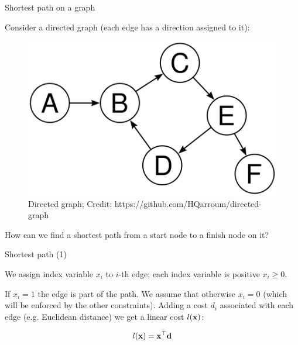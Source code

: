 \documentclass{beamer}
\begin{document}
\begin{frame}{Shortest path on a graph}
\begin{flushleft}

Consider a directed graph (each edge has a direction assigned to it):

\begin{figure}
	\centering
	\includegraphics[width=0.5\linewidth]{DirectedGraph}
	\caption[]{Directed graph; \scriptsize{Credit: https://github.com/HQarroum/directed-graph}}
	\label{fig:directedgraph}
\end{figure}

How can we find a shortest path from a start node to a finish node on it?

\end{flushleft}
\end{frame}



\begin{frame}{Shortest path (1)}
\begin{flushleft}

We assign index variable $x_i$ to $i$-th edge; each index variable is positive $x_i \geq 0$. 

\bigskip

If $x_i = 1$ the edge is part of the path. We assume that otherwise $x_i = 0$ (which will be enforced by the other constraints). Adding a cost $d_i$ associated with each edge (e.g. Euclidean distance) we get a linear cost $l(\mathbf{x})$:

\begin{equation}
	l(\mathbf{x}) = \mathbf{x}^\top \mathbf{d}
\end{equation}

 
\end{flushleft}
\end{frame}
\end{document}
